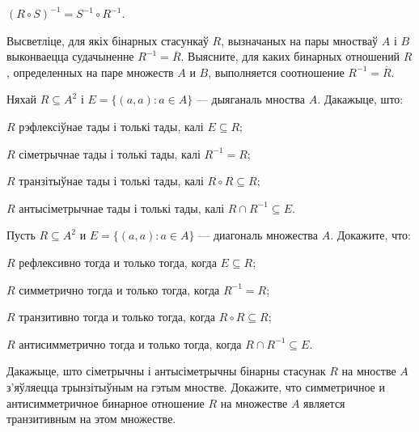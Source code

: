 \begin{problemList}
{\begin{belarusianEnumerate}
\item $(R \circ S)^{-1} = S^{-1} \circ R^{-1}$.
	
\end{belarusianEnumerate}
}

\bigskip

\problemItemSimple
{Высветліце, для якіх бінарных стасункаў $R$, вызначаных на пары мностваў $A$ і $B$ выконваецца судачыненне $R^{-1} = \overline{R}$.}
{Выясните, для каких бинарных отношений $R$, определенных на паре
множеств $A$ и $B$, выполняется соотношение $R^{-1} = \overline{R}$.}

\bigskip

\problemItemSimple
{%
Няхай $R \subseteq A^2$ і $E = \{(a, a) \colon a \in A\}$ --- дыяганаль мноства $A$. Дакажыце, што:
\begin{belarusianEnumerate}
	\item $R$ рэфлексіўнае тады і толькі тады, калі $E \subseteq R$;
	\item $R$ сіметрычнае тады і толькі тады, калі $R^{-1} = R$;
	\item $R$ транзітыўнае тады і толькі тады, калі $R \circ R \subseteq R$;
	\item $R$ антысіметрычнае тады і толькі тады, калі $R \cap R^{-1} \subseteq E$.
\end{belarusianEnumerate}
\textbf{}
\vspace{-1.5em}
}
{%
Пусть $R \subseteq A^2$ и $E = \{(a, a) \colon a \in A\}$ --- диагональ множества $A$. Докажите, что:
\begin{russianEnumerate}
	\item $R$ рефлексивно тогда и только тогда, когда $E \subseteq R$;
	\item $R$ симметрично тогда и только тогда, когда $R^{-1} = R$;
	\item $R$ транзитивно тогда и только тогда, когда $R \circ R \subseteq R$;
	\item $R$ антисимметрично тогда и только тогда, когда $R \cap R^{-1} \subseteq E$.
\end{russianEnumerate}
}

\bigskip

\problemItemSimple
{Дакажыце, што сіметрычны і антысіметрычны бінарны стасунак $R$ на мностве $A$ з'яўляецца трынзітыўным на гэтым мностве.}
{Докажите, что симметричное и антисимметричное бинарное отношение $R$ на множестве $A$ является транзитивным на этом множестве.}

\bigskip


\end{problemList}
